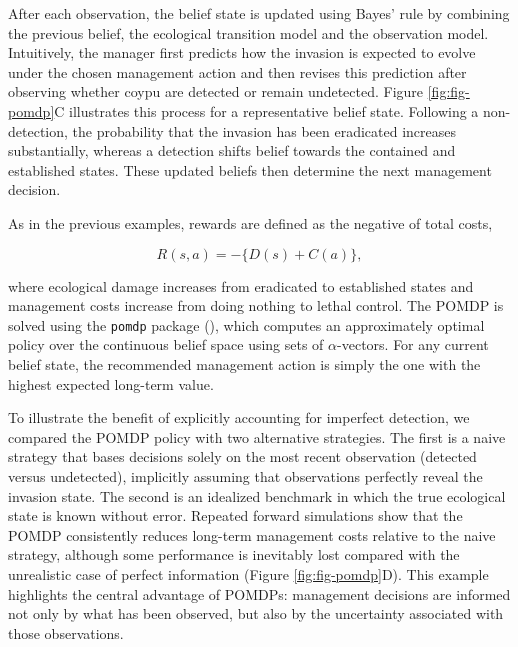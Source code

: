 \documentclass[
  11pt,
  a4paper,
]{article}
\begin{document}
After each observation, the belief state is updated using Bayes' rule by combining the previous belief, the ecological transition model and the observation model. Intuitively, the manager first predicts how the invasion is expected to evolve under the chosen management action and then revises this prediction after observing whether coypu are detected or remain undetected. Figure \ref{fig:fig-pomdp}C illustrates this process for a representative belief state. Following a non-detection, the probability that the invasion has been eradicated increases substantially, whereas a detection shifts belief towards the contained and established states. These updated beliefs then determine the next management decision.

As in the previous examples, rewards are defined as the negative of total costs,

\[
R(s,a)
=
-\{D(s)+C(a)\},
\]

where ecological damage increases from eradicated to established states and management costs increase from doing nothing to lethal control. The POMDP is solved using the \texttt{pomdp} package (), which computes an approximately optimal policy over the continuous belief space using sets of \(\alpha\)-vectors. For any current belief state, the recommended management action is simply the one with the highest expected long-term value.

To illustrate the benefit of explicitly accounting for imperfect detection, we compared the POMDP policy with two alternative strategies. The first is a naive strategy that bases decisions solely on the most recent observation (detected versus undetected), implicitly assuming that observations perfectly reveal the invasion state. The second is an idealized benchmark in which the true ecological state is known without error. Repeated forward simulations show that the POMDP consistently reduces long-term management costs relative to the naive strategy, although some performance is inevitably lost compared with the unrealistic case of perfect information (Figure \ref{fig:fig-pomdp}D). This example highlights the central advantage of POMDPs: management decisions are informed not only by what has been observed, but also by the uncertainty associated with those observations.
\end{document}
